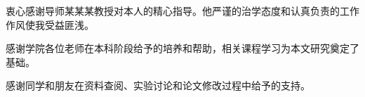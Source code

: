 \begin{acknowledgements}
衷心感谢导师某某某教授对本人的精心指导。他严谨的治学态度和认真负责的工作作风使我受益匪浅。

感谢学院各位老师在本科阶段给予的培养和帮助，相关课程学习为本文研究奠定了基础。

感谢同学和朋友在资料查阅、实验讨论和论文修改过程中给予的支持。

\end{acknowledgements}
